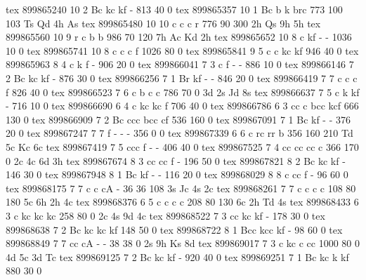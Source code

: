 tex       899865240 10  2 Bc  kc    kf    -          813   40    0 
tex       899865357 10  1 Bc  b     k     brc        773  100  103 Ts Qd 4h As
tex       899865480 10 10 c   c     c     r          776   90  300 2h Qs 9h 5h
tex       899865560 10  9 r   c     b     b          986   70  120 7h Ac Kd 2h
tex       899865652 10  8 c   kf    -     -         1036   10    0 
tex       899865741 10  8 c   c     c     f         1026   80    0 
tex       899865841  9  5 c   c     kc    kf         946   40    0 
tex       899865963  8  4 c   k     f     -          906   20    0 
tex       899866041  7  3 c   f     -     -          886   10    0 
tex       899866146  7  2 Bc  kc    kf    -          876   30    0 
tex       899866256  7  1 Br  kf    -     -          846   20    0 
tex       899866419  7  7 c   c     c     f          826   40    0 
tex       899866523  7  6 c   b     c     c          786   70    0 3d 2s Jd 8s
tex       899866637  7  5 c   k     kf    -          716   10    0 
tex       899866690  6  4 c   kc    kc    f          706   40    0 
tex       899866786  6  3 cc  c     bcc   kcf        666  130    0 
tex       899866909  7  2 Bc  ccc   bcc   cf         536  160    0 
tex       899867091  7  1 Bc  kf    -     -          376   20    0 
tex       899867247  7  7 f   -     -     -          356    0    0 
tex       899867339  6  6 c   rc    rr    b          356  160  210 Td 5c Kc 6c
tex       899867419  7  5 ccc f     -     -          406   40    0 
tex       899867525  7  4 cc  cc    cc    c          366  170    0 2c 4c 6d 3h
tex       899867674  8  3 cc  cc    f     -          196   50    0 
tex       899867821  8  2 Bc  kc    kf    -          146   30    0 
tex       899867948  8  1 Bc  kf    -     -          116   20    0 
tex       899868029  8  8 c   cc    f     -           96   60    0 
tex       899868175  7  7 c   c     cA    -           36   36  108 3s Jc 4s 2c
tex       899868261  7  7 c   c     c     c          108   80  180 5c 6h 2h 4c
tex       899868376  6  5 c   c     c     c          208   80  130 6c 2h Td 4s
tex       899868433  6  3 c   kc    kc    kc         258   80    0 2c 4s 9d 4c
tex       899868522  7  3 cc  kc    kf    -          178   30    0 
tex       899868638  7  2 Bc  kc    kc    kf         148   50    0 
tex       899868722  8  1 Bcc kcc   kf    -           98   60    0 
tex       899868849  7  7 cc  cA    -     -           38   38    0 2s 9h Ks 8d
tex       899869017  7  3 c   kc    c     cc        1000   80    0 4d 5c 3d Tc
tex       899869125  7  2 Bc  kc    kf    -          920   40    0 
tex       899869251  7  1 Bc  kc    k     kf         880   30    0 
